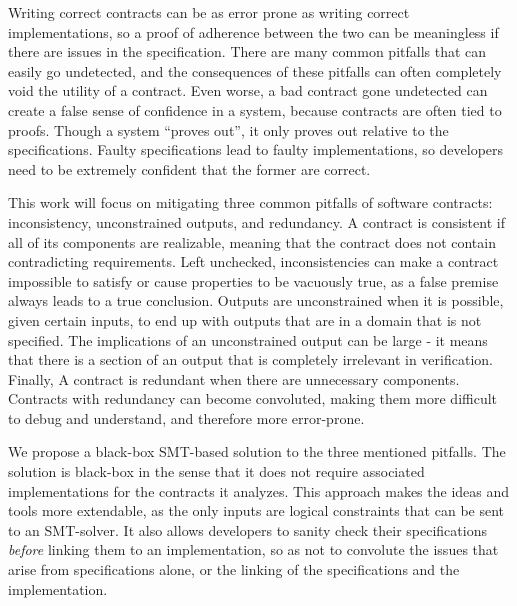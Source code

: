 \documentclass{article}
\newif\ifcomments
\newcommand{\egm}[1]{\ifcomments\textcolor{orange}{egm: #1}\fi}
\begin{document}
Writing correct contracts can be as error prone as writing correct implementations, so a proof of adherence
between the two can be meaningless if there are issues in the specification. There are many common pitfalls
that can easily go undetected, and the consequences of these pitfalls can often completely void the utility of
a contract. Even worse, a bad contract gone undetected can create a false sense of confidence in a system,
because contracts are often tied to proofs. Though a system “proves out”, it only proves out relative to the
specifications. Faulty specifications lead to faulty implementations, so developers need to be extremely confident
that the former are correct.
\egm{I might suggest that faulty contracts lead to implementations that do not have the intended behavior.}

This work will focus on mitigating three common pitfalls of software contracts: inconsistency, unconstrained
outputs, and redundancy. A contract is consistent if all of its components are realizable, meaning that the contract
does not contain contradicting requirements. Left unchecked, inconsistencies can make a contract impossible to satisfy
or cause properties to be vacuously true, as a false premise always leads to a true conclusion. Outputs are
unconstrained when it is possible, given certain inputs, to end up with outputs that are in a domain that is not specified.
The implications of an unconstrained output can be large - it means that there is a section of an output that is
completely irrelevant in verification. Finally, A contract is redundant when there are unnecessary components. Contracts
with redundancy can become convoluted, making them more difficult to debug and understand, and therefore more
error-prone.
\egm{Maybe, redundant makes a contract more difficult to \textbf{read} and understand?}

We propose a black-box SMT-based solution to the three mentioned pitfalls. The solution is black-box in the sense
that it does not require associated implementations for the contracts it analyzes. This approach makes the ideas and tools
more extendable, as the only inputs are logical constraints that can be sent to an SMT-solver. It also allows developers
to sanity check their specifications {\it before} linking them to an implementation, so as not to convolute the issues
that arise from specifications alone, or the linking of the specifications and the implementation.
\egm{I might suggest that the ideal way to create a software system is to first write the contract specification, with any appropriate proofs, and then implement each contract. Writing what the system should do before implementation lets designers reason in the abstract before working out how the actual computation takes place so the properties of the systems, and key components, are known prior to implementation. In any case, I'm not sure blackbox is a good fit for the text. I might suggest that the key here is that the contract itself, and not the implementation, is what is being exercised. The analysis is agnostic to any given implementation because it reasons solely about what is stated in the contract itself.}
\end{document}
